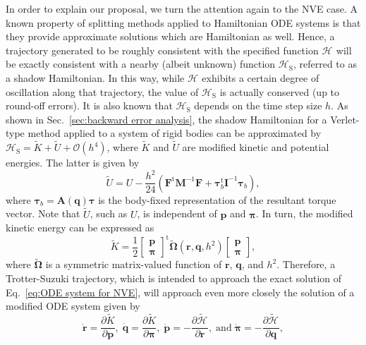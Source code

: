 \documentclass[
journal=jctcce,
layout=twocolumn
]{achemso}
\newcommand{\mt}[1]{\boldsymbol{\mathbf{#1}}}   %
\newcommand{\vt}[1]{\boldsymbol{\mathbf{#1}}}   %
\newcommand{\tr}[1]{#1^\text{t}}                %
\newcommand{\diff}[2]{\frac{\partial #1}{\partial #2}} %
\newcommand{\Ham}[1]{{\mathcal H}_\text{#1}}    %
\newcommand{\timestep}{h}
\newcommand{\modified}[1]{\widetilde{#1}}
\begin{document}
In order to explain our proposal, we turn the attention again to the NVE case. A known property of splitting methods applied to Hamiltonian ODE systems is that they provide approximate solutions which are Hamiltonian as well. Hence, a trajectory generated to be roughly consistent with the specified function $\Ham{}$ will be exactly consistent with a nearby (albeit unknown) function $\Ham{S}$, referred to as a shadow Hamiltonian. In this way, while $\Ham{}$ exhibits a certain degree of oscillation along that trajectory, the value of $\Ham{S}$ is actually conserved (up to round-off errors). It is also known that $\Ham{S}$ depends on the time step size $\timestep$. As shown in Sec.~\ref{sec:backward error analysis}, the shadow Hamiltonian for a Verlet-type method applied to a system of rigid bodies can be approximated by $\Ham{S} = \modified K + \modified U + \mathcal{O}(h^4)$, where $\modified K$ and $\modified U$ are modified kinetic and potential energies. The latter is given by
\begin{equation}
\label{eq:modified potential energy}
\modified U = U - \frac{\timestep^2}{24} \left( \tr{\vt F} {\mt M}^{-1} {\vt F} + \tr{\vt \tau}_b {\mt I}^{-1} {\vt \tau}_b \right),
\end{equation}
where ${\vt \tau}_b = {\mt A}(\vt q) {\vt \tau}$ is the body-fixed representation of the resultant torque vector. Note that $\modified U$, such as $U$, is independent of $\vt p$ and $\vt \pi$. In turn, the modified kinetic energy can be expressed as
\begin{equation}
\label{eq:modified kinetic energy}
\modified K = \frac{1}{2} \tr{ \left[\begin{array}{c} \vt p \\ \vt \pi \end{array}\right]} \modified{\mathbf \Omega}(\vt r, \vt q, \timestep^2) \left[\begin{array}{c} \vt p \\ \vt \pi \end{array}\right],
\end{equation}
where $\modified{\mathbf \Omega}$ is a symmetric matrix-valued function of $\vt r$, $\vt q$, and $\timestep^2$. Therefore, a Trotter-Suzuki trajectory, which is intended to approach the exact solution of Eq.~\eqref{eq:ODE system for NVE}, will approach even more closely the solution of a modified ODE system given by
\begin{equation*}
\dot{\vt r} = \diff{\modified K}{\vt p}, \;
\dot{\vt q} = \diff{\modified K}{\vt \pi}, \;
\dot{\vt p} = -\diff{\modified{\Ham{}}}{\vt r}, \; \text{and} \;
\dot{\vt \pi} = -\diff{\modified{\Ham{}}}{\vt q},
\end{equation*}
\end{document}
